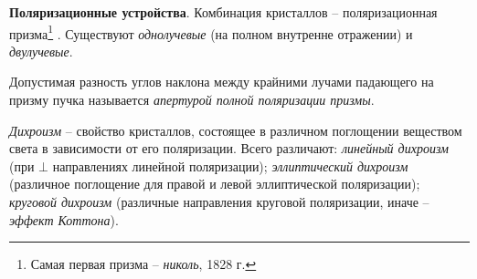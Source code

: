 

\textbf{Поляризационные устройства}. Комбинация кристаллов -- поляризационная призма\footnote{
    Самая первая призма -- \textit{николь}, 1828 г.
} . Существуют \textit{однолучевые} (на полном внутренне отражении) и \textit{двулучевые}. 

\begin{to_def}
    Допустимая разность углов наклона между крайними лучами падающего на призму пучка называется \textit{апертурой полной поляризации призмы}.
\end{to_def}

\begin{to_def}
    \textit{Дихроизм} -- свойство кристаллов, состоящее в различном поглощении веществом света в зависимости от его поляризации. Всего различают: \textit{линейный дихроизм} (при $\bot$ направлениях линейной поляризации); \textit{эллиптический дихроизм} (различное поглощение для правой и левой эллиптической поляризации); \textit{круговой дихроизм} (различные направления круговой поляризации, иначе -- \textit{эффект Коттона}). 
\end{to_def}

